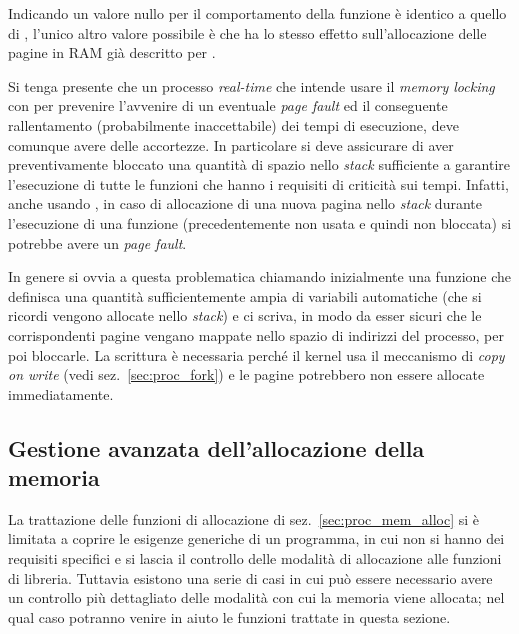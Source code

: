 
Indicando un valore nullo per  il comportamento della funzione è
identico a quello di , l'unico altro valore possibile è
 che ha lo stesso effetto sull'allocazione delle pagine
in RAM già descritto per .

Si tenga presente che un processo \textit{real-time} che intende usare il
\textit{memory locking} con  per prevenire l'avvenire di un
eventuale \textit{page fault} ed il conseguente rallentamento (probabilmente
inaccettabile) dei tempi di esecuzione, deve comunque avere delle accortezze.
In particolare si deve assicurare di aver preventivamente bloccato una
quantità di spazio nello \textit{stack} sufficiente a garantire l'esecuzione
di tutte le funzioni che hanno i requisiti di criticità sui tempi. Infatti,
anche usando , in caso di allocazione di una nuova pagina
nello \textit{stack} durante l'esecuzione di una funzione (precedentemente non
usata e quindi non bloccata) si potrebbe avere un \textit{page fault}.

In genere si ovvia a questa problematica chiamando inizialmente una funzione
che definisca una quantità sufficientemente ampia di variabili automatiche
(che si ricordi vengono allocate nello \textit{stack}) e ci scriva, in modo da
esser sicuri che le corrispondenti pagine vengano mappate nello spazio di
indirizzi del processo, per poi bloccarle. La scrittura è necessaria perché il
kernel usa il meccanismo di \textit{copy on write} (vedi
sez.~\ref{sec:proc_fork}) e le pagine potrebbero non essere allocate
immediatamente.



\subsection{Gestione avanzata dell'allocazione della memoria} 
\label{sec:proc_memory_adv_management}

La trattazione delle funzioni di allocazione di sez.~\ref{sec:proc_mem_alloc}
si è limitata a coprire le esigenze generiche di un programma, in cui non si
hanno dei requisiti specifici e si lascia il controllo delle modalità di
allocazione alle funzioni di libreria.  Tuttavia esistono una serie di casi in
cui può essere necessario avere un controllo più dettagliato delle modalità
con cui la memoria viene allocata; nel qual caso potranno venire in aiuto le
funzioni trattate in questa sezione.

